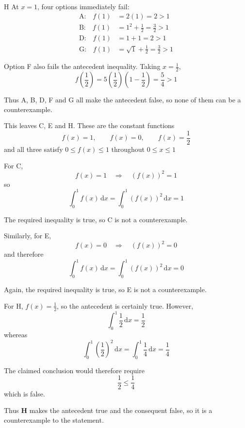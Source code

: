 \documentclass[11pt,a4paper]{article}
\begin{document}
\begin{enumerate}[label=\textbf{\arabic*.},leftmargin=*,itemsep=0pt,start=9]
\begin{djsSolution}{H}
At \(x=1\), four options immediately fail:
\[
\begin{aligned}
\text{A:}\quad f(1)&=2(1)=2>1\\
\text{B:}\quad f(1)&=1^2+\frac12=\frac32>1\\
\text{D:}\quad f(1)&=1+1=2>1\\
\text{G:}\quad f(1)&=\sqrt{1}+\frac12=\frac32>1
\end{aligned}
\]

Option F also fails the antecedent inequality. Taking \(x=\frac12\),
\[
f\left(\frac12\right)
=
5\left(\frac12\right)\left(1-\frac12\right)
=
\frac54>1
\]

Thus A, B, D, F and G all make the antecedent false, so none of them can be a counterexample.

This leaves C, E and H. These are the constant functions
\[
f(x)=1,\qquad f(x)=0,\qquad f(x)=\frac12
\]
and all three satisfy \(0\leq f(x)\leq1\) throughout \(0\leq x\leq1\)

For C,
\[
f(x)=1
\quad\Longrightarrow\quad
(f(x))^2=1
\]
so
\[
\int_0^1 f(x)\,\mathrm{d}x
=
\int_0^1 (f(x))^2\,\mathrm{d}x
=
1
\]

The required inequality is true, so C is not a counterexample.

Similarly, for E,
\[
f(x)=0
\quad\Longrightarrow\quad
(f(x))^2=0
\]
and therefore
\[
\int_0^1 f(x)\,\mathrm{d}x
=
\int_0^1 (f(x))^2\,\mathrm{d}x
=
0
\]

Again, the required inequality is true, so E is not a counterexample.

For H, \(f(x)=\frac12\), so the antecedent is certainly true. However,
\[
\int_0^1\frac12\,\mathrm{d}x
=
\frac12
\]
whereas
\[
\int_0^1\left(\frac12\right)^2\,\mathrm{d}x
=
\int_0^1\frac14\,\mathrm{d}x
=
\frac14
\]

The claimed conclusion would therefore require
\[
\frac12\leq\frac14
\]
which is false.

Thus \textbf{H} makes the antecedent true and the consequent false, so it is a counterexample to the statement.
\end{djsSolution}
\end{enumerate}
\clearpage
\thispagestyle{djssolutions}
\vspace*{8pt}
\end{document}

